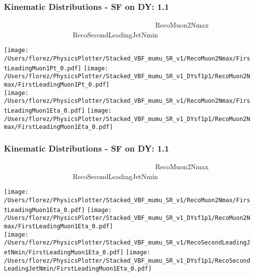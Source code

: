 \documentclass{beamer}
\begin{document}


\begin{frame}
\frametitle{Kinematic Distributions - SF on DY: 1.1}
\tiny{~~~~~~~~~~~~~~~~~~~~~~~~~~~~~~~~~~~~~~~~~~~~RecoMuon2Nmax~~~~~~~~~~~~~~~~~~~~~~~~~~~~~~~~RecoSecondLeadingJetNmin}\\
\begin{center}
 
   \texttt{[image: /Users/florez/PhysicsPlotter/Stacked\_VBF\_mumu\_SR\_v1/RecoMuon2Nmax/FirstLeadingMuon1Pt\_0.pdf]}
  \texttt{[image: /Users/florez/PhysicsPlotter/Stacked\_VBF\_mumu\_SR\_v1\_DYsf1p1/RecoMuon2Nmax/FirstLeadingMuon1Pt\_0.pdf]}\\
  
 
   \texttt{[image: /Users/florez/PhysicsPlotter/Stacked\_VBF\_mumu\_SR\_v1/RecoMuon2Nmax/FirstLeadingMuon1Eta\_0.pdf]}
  \texttt{[image: /Users/florez/PhysicsPlotter/Stacked\_VBF\_mumu\_SR\_v1\_DYsf1p1/RecoMuon2Nmax/FirstLeadingMuon1Eta\_0.pdf]}\\
 
\end{center}

\end{frame}

\begin{frame}
\frametitle{Kinematic Distributions - SF on DY: 1.1}
\tiny{~~~~~~~~~~~~~~~~~~~~~~~~~~~~~~~~~~~~~~~~~~~~RecoMuon2Nmax~~~~~~~~~~~~~~~~~~~~~~~~~~~~~~~~RecoSecondLeadingJetNmin}\\
\begin{center}
 
   \texttt{[image: /Users/florez/PhysicsPlotter/Stacked\_VBF\_mumu\_SR\_v1/RecoMuon2Nmax/FirstLeadingMuon1Eta\_0.pdf]}
  \texttt{[image: /Users/florez/PhysicsPlotter/Stacked\_VBF\_mumu\_SR\_v1\_DYsf1p1/RecoMuon2Nmax/FirstLeadingMuon1Eta\_0.pdf]}\\
  
 
   \texttt{[image: /Users/florez/PhysicsPlotter/Stacked\_VBF\_mumu\_SR\_v1/RecoSecondLeadingJetNmin/FirstLeadingMuon1Eta\_0.pdf]}
  \texttt{[image: /Users/florez/PhysicsPlotter/Stacked\_VBF\_mumu\_SR\_v1\_DYsf1p1/RecoSecondLeadingJetNmin/FirstLeadingMuon1Eta\_0.pdf]}\\
 
\end{center}

\end{frame}
\end{document}
